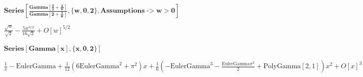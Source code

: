 \documentclass{article}
\begin{document}
\begin{doublespace}
\noindent\(\pmb{\text{Series}\left[\frac{\text{Gamma}\left[\frac{3}{2}+\frac{2}{w}\right]}{\text{Gamma}\left[2+\frac{2}{w}\right]},\{w,0,2\}, \text{Assumptions}\text{-$>$}w>0\right]}\)
\end{doublespace}

\begin{doublespace}
\noindent\(\frac{\sqrt{w}}{\sqrt{2}}-\frac{5 w^{3/2}}{16 \sqrt{2}}+O[w]^{5/2}\)
\end{doublespace}

\begin{doublespace}
\noindent\(\pmb{\text{Series}[\text{Gamma}[x],\{x,0,2\}]}\)
\end{doublespace}

\begin{doublespace}
\noindent\(\frac{1}{x}-\text{EulerGamma}+\frac{1}{12} \left(6 \text{EulerGamma}^2+\pi ^2\right) x+\frac{1}{6} \left(-\text{EulerGamma}^3-\frac{\text{EulerGamma}
\pi ^2}{2}+\text{PolyGamma}[2,1]\right) x^2+O[x]^3\)
\end{doublespace}
\end{document}
